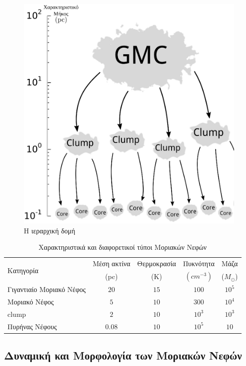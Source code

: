 \documentclass[a4paper,12pt]{memoir}
\newcommand{\sm}{$M_{\odot}$}
\begin{document}
%
\begin{figure}[hb]
	\centering
	\includegraphics[width=15cm]{images/fragmentation.ps}
	\caption{Η ιεραρχική δομή}
\end{figure}

\begin{table}
	\caption{Χαρακτηριστικά και διαφορετικοί τύποι Μοριακών Νεφών}
	\label{tab:MCtypes}
	\begin{tabular}{l c c c c}
		\toprule
		\multirow{2}{*}{Κατηγορία} & Μέση ακτίνα &  Θερμοκρασία & Πυκνότητα \ce{H2} & Μάζα \\ 
		& (pc) & (K) & $(cm^{-3})$ & (\sm) \\
		\midrule
		Γιγαντιαίο Μοριακό Νέφος & $20$ & $15$ & $100$ & $10^5$ \\
		Μοριακό Νέφος & $5$ & $10$ & $300$ & $10^4$\\
		clump & $2$ & $10$ & $10^3$ & $10^3$\\
		Πυρήνας Νέφους & $0.08$ & $10$ & $10^5$ & $10$\\
		\bottomrule
	\end{tabular}
\end{table}

\subsection{Δυναμική και Μορφολογία των Μοριακών Νεφών}
\end{document}
